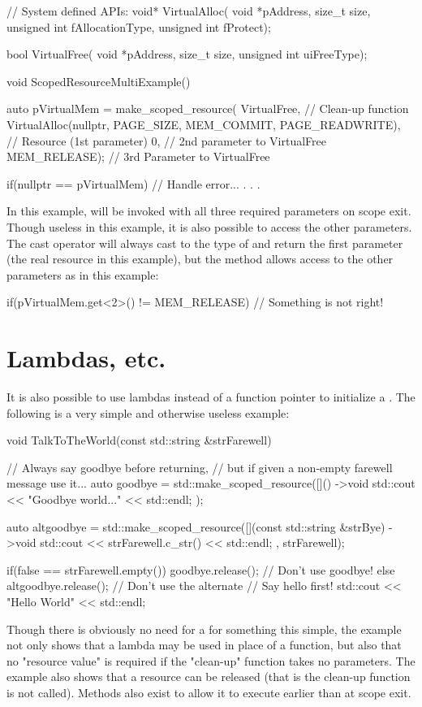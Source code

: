 \documentclass[ebook,11pt,article]{memoir}
\begin{document}
\begin{codeblock}
// System defined APIs:
void* VirtualAlloc(
    void *pAddress,
    size_t size,
    unsigned int fAllocationType,
    unsigned int fProtect);

bool VirtualFree(
    void *pAddress,
    size_t size,
    unsigned int uiFreeType);

void ScopedResourceMultiExample()
{
	auto pVirtualMem = make_scoped_resource(
		VirtualFree,			// Clean-up function
		VirtualAlloc(nullptr,
			PAGE_SIZE,
			MEM_COMMIT,
			PAGE_READWRITE),	// Resource (1st parameter)
		0,				// 2nd parameter to VirtualFree
		MEM_RELEASE);			// 3rd Parameter to VirtualFree

	if(nullptr == pVirtualMem)
	{
		// Handle error...
	}
	.
	.
	.
}
\end{codeblock}
In this example,  will be invoked with all three required parameters on scope exit.  Though useless in this example, it is also possible to access the other parameters.  The cast operator will always cast to the type of and return the first parameter (the real resource in this example), but the  method allows access to the other parameters as in this example:
\begin{codeblock}


if(pVirtualMem.get<2>() != MEM_RELEASE)
{
	// Something is not right!
}
\end{codeblock}

\section{Lambdas, etc.}
It is also possible to use lambdas instead of a function pointer to initialize a .  The following is a very simple and otherwise useless example:

\begin{codeblock}
void TalkToTheWorld(const std::string &strFarewell)
{
	// Always say goodbye before returning, 
	// but if given a non-empty farewell message use it...
	auto goodbye = std::make_scoped_resource([]() ->void
	{
		std::cout << "Goodbye world..." << std::endl;
	});
	
	auto altgoodbye = std::make_scoped_resource([](const std::string &strBye) ->void
	{
		std::cout << strFarewell.c_str() << std::endl;
	},
	strFarewell);

	if(false == strFarewell.empty())
	{
		goodbye.release();		// Don't use goodbye!
	}
	else
	{
		altgoodbye.release();	// Don't use the alternate
	}
	// Say hello first!
	std::cout << "Hello World" << std::endl;
}
\end{codeblock}
Though there is obviously no need for a  for something this simple, the example not only shows that a lambda may be used in place of a function, but also that no "resource value" is required if the "clean-up" function takes no parameters.  The example also shows that a resource can be released (that is the clean-up function is not called).  Methods also exist to allow it to execute earlier than at scope exit.
\end{document}
